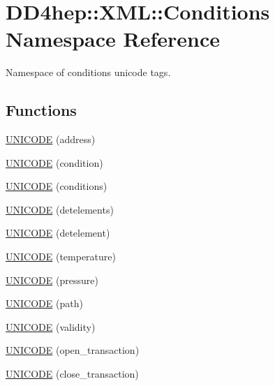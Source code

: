 \hypertarget{namespace_d_d4hep_1_1_x_m_l_1_1_conditions}{}\section{D\+D4hep\+:\+:X\+ML\+:\+:Conditions Namespace Reference}
\label{namespace_d_d4hep_1_1_x_m_l_1_1_conditions}


Namespace of conditions unicode tags.  


\subsection*{Functions}
\begin{DoxyCompactItemize}
\item 
\hyperlink{namespace_d_d4hep_1_1_x_m_l_1_1_conditions_a5373ad820618f7d952564658d2fc4cca}{U\+N\+I\+C\+O\+DE} (address)
\item 
\hyperlink{namespace_d_d4hep_1_1_x_m_l_1_1_conditions_ac093cd39504ee451f2fbcf994d26075d}{U\+N\+I\+C\+O\+DE} (condition)
\item 
\hyperlink{namespace_d_d4hep_1_1_x_m_l_1_1_conditions_a093d9fab1388f560fa6d55926f5f83fd}{U\+N\+I\+C\+O\+DE} (conditions)
\item 
\hyperlink{namespace_d_d4hep_1_1_x_m_l_1_1_conditions_a02e5ebe727f41aef055c9ad425d0fe43}{U\+N\+I\+C\+O\+DE} (detelements)
\item 
\hyperlink{namespace_d_d4hep_1_1_x_m_l_1_1_conditions_a05b5d8b1289036d694eee2c28a6997f8}{U\+N\+I\+C\+O\+DE} (detelement)
\item 
\hyperlink{namespace_d_d4hep_1_1_x_m_l_1_1_conditions_ae49c95fc28ac05985c3ce1fe4340f888}{U\+N\+I\+C\+O\+DE} (temperature)
\item 
\hyperlink{namespace_d_d4hep_1_1_x_m_l_1_1_conditions_a9c6ea9652e1ceb1b588f4d032d43365a}{U\+N\+I\+C\+O\+DE} (pressure)
\item 
\hyperlink{namespace_d_d4hep_1_1_x_m_l_1_1_conditions_a5dba8de772bb2c909d53918606865cb9}{U\+N\+I\+C\+O\+DE} (path)
\item 
\hyperlink{namespace_d_d4hep_1_1_x_m_l_1_1_conditions_a4b1aedbbdeb90f5760cb652b73627e50}{U\+N\+I\+C\+O\+DE} (validity)
\item 
\hyperlink{namespace_d_d4hep_1_1_x_m_l_1_1_conditions_a9e72d71de115bf1f93f71ae147c66f8d}{U\+N\+I\+C\+O\+DE} (open\+\_\+transaction)
\item 
\hyperlink{namespace_d_d4hep_1_1_x_m_l_1_1_conditions_ae58987a149ce1c597ae2c64aab52892a}{U\+N\+I\+C\+O\+DE} (close\+\_\+transaction)
\end{DoxyCompactItemize}


